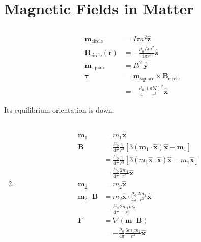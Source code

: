 \documentclass{article}
\renewcommand{\vec}[1]{\boldsymbol{\mathbf{#1}}}
\newcommand{\uvec}[1]{\hat{\vec{#1}}}
\begin{document}
\section{Magnetic Fields in Matter}

\subsection{}

\begin{align*}
  \vec{m}_\text{circle}          & = I \pi a^2 \uvec{z}                                 \\
  \vec{B}_\text{circle}(\vec{r}) & = -\frac{\mu_0 I \pi a^2}{4 \pi r^3} \uvec{z}        \\
  \vec{m}_\text{square}          & = I b^2 \,\uvec{y}                                   \\
  \vec{\tau}                     & = \vec{m}_\text{square} \times \vec{B}_\text{circle} \\
                                 & = -\frac{\mu_0}{4} \frac{(a b I)^2}{r^3} \uvec{x}
\end{align*}

Its equilibrium orientation is down.

\setcounter{subsection}{2}
\subsection{}

\begin{enumerate}
  \setcounter{enumi}{1}
  \item

        \begin{align*}
          \vec{m}_1               & = m_1 \uvec{x}                                                                                \\
          \vec{B}                 & = \frac{\mu_0}{4 \pi} \frac{1}{r^3} [3 (\vec{m}_1 \cdot \uvec{x}) \uvec{x} - \vec{m}_1]       \\
                                  & = \frac{\mu_0}{4 \pi} \frac{1}{r^3} [3 (m_1 \uvec{x} \cdot \uvec{x}) \uvec{x} - m_1 \uvec{x}] \\
                                  & = \frac{\mu_0}{4 \pi} \frac{2 m_1}{r^3} \uvec{x}                                              \\
          \vec{m}_2               & = m_2 \uvec{x}                                                                                \\
          \vec{m}_2 \cdot \vec{B} & = m_2 \uvec{x} \cdot \frac{\mu_0}{4 \pi} \frac{2 m_1}{r^3} \uvec{x}                           \\
                                  & = \frac{\mu_0}{4 \pi} \frac{2 m_1 m_2}{r^3}                                                   \\
          \vec{F}                 & = \nabla (\vec{m} \cdot \vec{B})                                                              \\
                                  & = -\frac{\mu_0}{4 \pi} \frac{6 m_1 m_2}{r^4} \uvec{x}
        \end{align*}
\end{enumerate}
\end{document}
